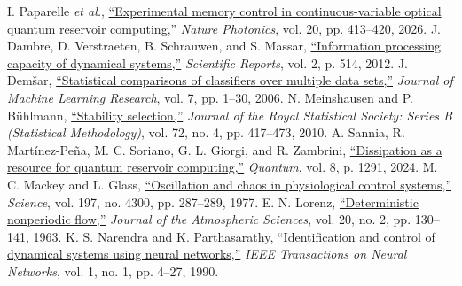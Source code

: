 \documentclass[10pt,conference]{IEEEtran}
\newcommand{\QRCdoi}[2]{\href{#1}{#2}}
\newcommand{\QRCdoi}[2]{#2}
\begin{document}
{\begin{thebibliography}{99}
 I. Paparelle \emph{et al.}, \QRCdoi{https://doi.org/10.1038/s41566-026-01880-9}{``Experimental memory control in continuous-variable optical quantum reservoir computing,''} \emph{Nature Photonics}, vol. 20, pp. 413--420, 2026.
 J. Dambre, D. Verstraeten, B. Schrauwen, and S. Massar, \QRCdoi{https://doi.org/10.1038/srep00514}{``Information processing capacity of dynamical systems,''} \emph{Scientific Reports}, vol. 2, p. 514, 2012.
 J. Dem{\v{s}}ar, \QRCdoi{https://www.jmlr.org/papers/v7/demsar06a.html}{``Statistical comparisons of classifiers over multiple data sets,''} \emph{Journal of Machine Learning Research}, vol. 7, pp. 1--30, 2006.
 N. Meinshausen and P. B\"{u}hlmann, \QRCdoi{https://doi.org/10.1111/j.1467-9868.2010.00740.x}{``Stability selection,''} \emph{Journal of the Royal Statistical Society: Series B (Statistical Methodology)}, vol. 72, no. 4, pp. 417--473, 2010.
 A. Sannia, R. Mart{\'i}nez-Pe\~{n}a, M. C. Soriano, G. L. Giorgi, and R. Zambrini, \QRCdoi{https://doi.org/10.22331/q-2024-03-20-1291}{``Dissipation as a resource for quantum reservoir computing,''} \emph{Quantum}, vol. 8, p. 1291, 2024.
 M. C. Mackey and L. Glass, \QRCdoi{https://doi.org/10.1126/science.267326}{``Oscillation and chaos in physiological control systems,''} \emph{Science}, vol. 197, no. 4300, pp. 287--289, 1977.
 E. N. Lorenz, \QRCdoi{https://doi.org/10.1175/1520-0469(1963)020\%3C0130:DNF\%3E2.0.CO;2}{``Deterministic nonperiodic flow,''} \emph{Journal of the Atmospheric Sciences}, vol. 20, no. 2, pp. 130--141, 1963.
 K. S. Narendra and K. Parthasarathy, \QRCdoi{https://doi.org/10.1109/72.80202}{``Identification and control of dynamical systems using neural networks,''} \emph{IEEE Transactions on Neural Networks}, vol. 1, no. 1, pp. 4--27, 1990.
\end{thebibliography}
}
\end{document}
